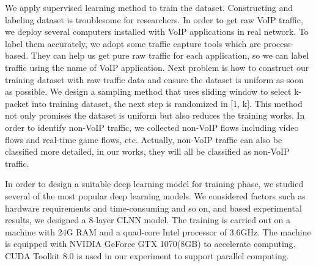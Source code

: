 \documentclass[conference]{IEEEtran}
\begin{document}
We apply supervised learning method to train the dataset. Constructing and labeling dataset is troublesome for researchers. In order to get raw VoIP traffic, we deploy several computers installed with VoIP applications in real network. To label them accurately, we adopt some traffic capture tools which are process-based. They can help us get pure raw traffic for each application, so we can label traffic using the name of VoIP application. Next problem is how to construct our training dataset with raw traffic data and ensure the dataset is uniform as soon as possible. We design a sampling method that uses sliding window to select k-packet into training dataset, the next step is randomized in [1, k]. This method not only promises the dataset is uniform but also reduces the training works. In order to identify non-VoIP traffic, we collected non-VoIP flows including video flows and real-time game flows, etc. Actually, non-VoIP traffic can also be classified more detailed, in our works, they will all be classified as non-VoIP traffic.

In order to design a suitable deep learning model for training phase, we studied several of the most popular deep learning models. We considered factors such as hardware requirements and time-consuming and so on, and based experimental results, we designed a 8-layer CLNN model. The training is carried out on a machine with 24G RAM and a quad-core Intel processor of 3.6GHz. The machine is equipped with NVIDIA GeForce GTX 1070(8GB) to accelerate computing. CUDA Toolkit 8.0 is used in our experiment to support parallel computing.

\end{document}
